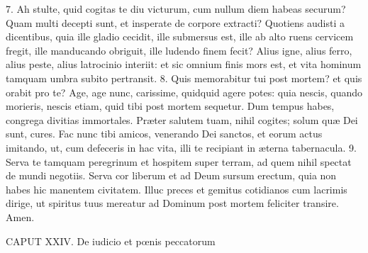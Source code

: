 7. Ah stulte, quid cogitas te diu victurum, cum nullum diem habeas securum? Quam multi decepti sunt, et insperate de corpore extracti? Quotiens audisti a dicentibus, quia ille gladio cecidit, ille submersus est, ille ab alto ruens cervicem fregit, ille manducando obriguit, ille ludendo finem fecit? Alius igne, alius ferro, alius peste, alius latrocinio interiit: et sic omnium finis mors est, et vita hominum tamquam umbra subito pertransit.
8. Quis memorabitur tui post mortem? et quis orabit pro te? Age, age nunc, carissime, quidquid agere potes: quia nescis, quando morieris, nescis etiam, quid tibi post mortem sequetur. Dum tempus habes, congrega divitias immortales. Præter salutem tuam, nihil cogites; solum quæ Dei sunt, cures. Fac nunc tibi amicos, venerando Dei sanctos, et eorum actus imitando, ut, cum defeceris in hac vita, illi te recipiant in æterna tabernacula.
9. Serva te tamquam peregrinum et hospitem super terram, ad quem nihil spectat de mundi negotiis. Serva cor liberum et ad Deum sursum erectum, quia non habes hic manentem civitatem. Illuc preces et gemitus cotidianos cum lacrimis dirige, ut spiritus tuus mereatur ad Dominum post mortem feliciter transire. Amen.


CAPUT XXIV.
De iudicio et pœnis peccatorum

